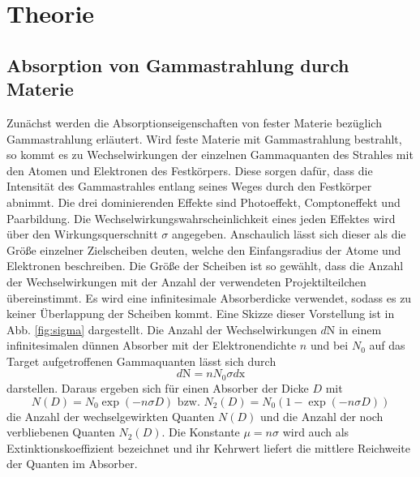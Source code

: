 
\section{Theorie}
\label{sec:Theorie}
\subsection{Absorption von Gammastrahlung durch Materie}
Zunächst werden die Absorptionseigenschaften von fester Materie bezüglich Gammastrahlung erläutert.
Wird feste Materie mit Gammastrahlung bestrahlt, so kommt es zu Wechselwirkungen der einzelnen Gammaquanten des Strahles mit den Atomen und Elektronen des Festkörpers. Diese sorgen dafür, dass die Intensität des Gammastrahles entlang seines Weges durch den Festkörper abnimmt. Die drei dominierenden Effekte sind Photoeffekt, Comptoneffekt und Paarbildung.
Die Wechselwirkungswahrscheinlichkeit eines jeden Effektes wird über den Wirkungsquerschnitt $\sigma$ angegeben.
 Anschaulich lässt sich dieser als die Größe einzelner Zielscheiben deuten, welche den Einfangsradius der Atome und Elektronen beschreiben. Die Größe der Scheiben ist so gewählt, dass die Anzahl der Wechselwirkungen mit der Anzahl der verwendeten Projektilteilchen  übereinstimmt. Es wird eine infinitesimale Absorberdicke verwendet, sodass es zu keiner Überlappung der Scheiben kommt. Eine Skizze dieser Vorstellung ist in Abb. \ref{fig:sigma} dargestellt.
Die Anzahl der Wechselwirkungen $d\text{N}$ in einem infinitesimalen dünnen Absorber mit der Elektronendichte $n$ und bei $N_0$ auf das Target aufgetroffenen Gammaquanten lässt sich durch
\begin{equation}
    d\text{N} = n N_0 \sigma d\text{x}
\end{equation}
darstellen. Daraus ergeben sich für einen Absorber der Dicke $D$ mit
\begin{equation}
N(D) = N_0 \exp(-n \sigma D) \text{  bzw.  }  N_2(D) = N_0 (1 - \exp(-n \sigma D))
\end{equation}
die Anzahl der wechselgewirkten Quanten $N(D)$ und die Anzahl der noch verbliebenen Quanten $N_2(D)$. Die Konstante $ \mu = n \sigma$ wird auch als Extinktionskoeffizient bezeichnet und ihr Kehrwert liefert die mittlere Reichweite der Quanten im Absorber.

